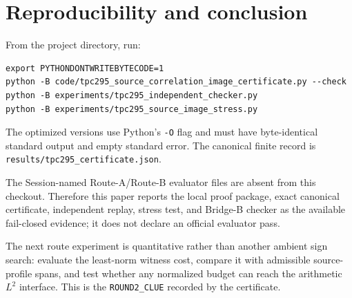\documentclass[10pt]{article}
\begin{document}
\section{Reproducibility and conclusion}

From the project directory, run:
\begin{verbatim}
export PYTHONDONTWRITEBYTECODE=1
python -B code/tpc295_source_correlation_image_certificate.py --check
python -B experiments/tpc295_independent_checker.py
python -B experiments/tpc295_source_image_stress.py
\end{verbatim}
The optimized versions use Python's \texttt{-O} flag and must have
byte-identical standard output and empty standard error.  The canonical
finite record is
\texttt{results/tpc295\_certificate.json}.

The Session-named Route-A/Route-B evaluator files are absent from this
checkout.  Therefore this paper reports the local proof package, exact
canonical certificate, independent replay, stress test, and Bridge-B
checker as the available fail-closed evidence; it does not declare an
official evaluator pass.

The next route experiment is quantitative rather than another ambient sign
search: evaluate the least-norm witness cost, compare it with admissible
source-profile spans, and test whether any normalized budget can reach the
arithmetic $L^2$ interface.  This is the
\texttt{ROUND2\_CLUE} recorded by the certificate.



\end{document}
